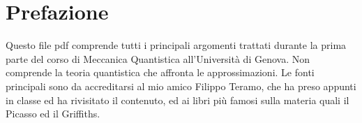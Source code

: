 \chapter{Prefazione}

	Questo file pdf comprende tutti i principali argomenti trattati durante la prima parte del corso di Meccanica Quantistica all'Università di Genova. Non comprende la teoria quantistica che affronta le approssimazioni. Le fonti principali sono da accreditarsi al mio amico Filippo Teramo, che ha preso appunti in classe ed ha rivisitato il contenuto, ed ai libri più famosi sulla materia quali il Picasso ed il Griffiths.
